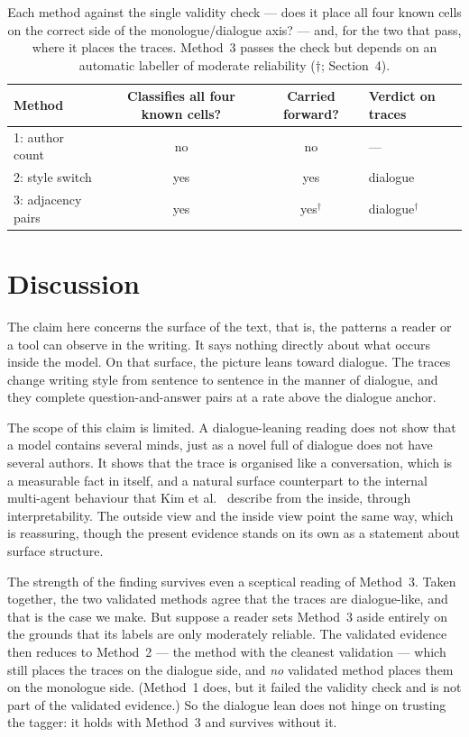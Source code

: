 \documentclass[10pt,twocolumn]{article}
\begin{document}
\begin{table}[t]
\centering
\small
\setlength{\tabcolsep}{8pt}
\caption{Each method against the single validity check --- does it place all four known cells on the
correct side of the monologue/dialogue axis? --- and, for the two that pass, where it places the
traces. Method~3 passes the check but depends on an automatic labeller of moderate reliability
($\dagger$; Section~4).}
\label{tab:verdict}
\begin{tabular}{@{}lccl@{}}
\toprule
Method & Classifies all four known cells? & Carried forward? & Verdict on traces \\
\midrule
1: author count & no & no & --- \\
2: style switch & yes & yes & \textcolor{dia}{dialogue} \\
3: adjacency pairs & yes & yes$^{\dagger}$ & \textcolor{dia}{dialogue}$^{\dagger}$ \\
\bottomrule
\end{tabular}
\end{table}

\section{Discussion}
The claim here concerns the surface of the text, that is, the patterns a reader or a tool can observe
in the writing. It says nothing directly about what occurs inside the model. On that surface, the
picture leans toward dialogue. The traces change writing style from sentence to sentence in the manner
of dialogue, and they complete question-and-answer pairs at a rate above the dialogue anchor.

The scope of this claim is limited. A dialogue-leaning reading does not show that a model contains
several minds, just as a novel full of dialogue does not have several authors. It shows that the trace
is organised like a conversation, which is a measurable fact in itself, and a natural surface
counterpart to the internal multi-agent behaviour that Kim et al.~\cite{kim2026} describe from the
inside, through interpretability. The outside view and the inside view point the same way, which is
reassuring, though the present evidence stands on its own as a statement about surface structure.

The strength of the finding survives even a sceptical reading of Method~3. Taken together, the two
validated methods agree that the traces are dialogue-like, and that is the case we make. But suppose a
reader sets Method~3 aside entirely on the grounds that its labels are only moderately reliable. The
validated evidence then reduces to Method~2 --- the method with the cleanest validation --- which
still places the traces on the dialogue side, and \emph{no} validated method places them on the
monologue side. (Method~1 does, but it failed the validity check and is not part of the validated
evidence.) So the dialogue lean does not hinge on trusting the tagger: it holds with Method~3 and
survives without it.
\end{document}
